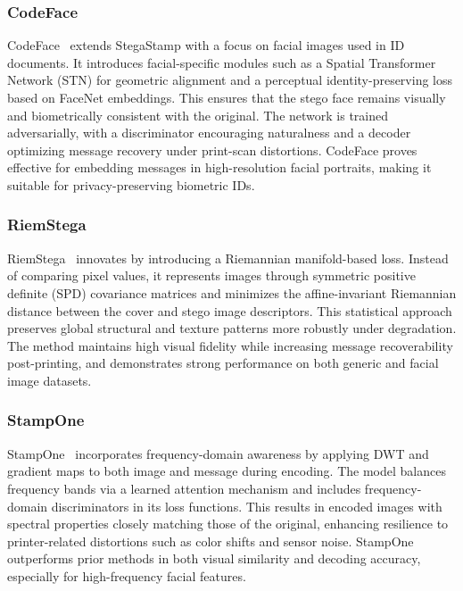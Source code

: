 \subsubsection{CodeFace}
CodeFace~\cite{codeface2021} extends StegaStamp with a focus on facial images used in ID documents. It introduces facial-specific modules such as a Spatial Transformer Network (STN) for geometric alignment and a perceptual identity-preserving loss based on FaceNet embeddings. This ensures that the stego face remains visually and biometrically consistent with the original. The network is trained adversarially, with a discriminator encouraging naturalness and a decoder optimizing message recovery under print-scan distortions. CodeFace proves effective for embedding messages in high-resolution facial portraits, making it suitable for privacy-preserving biometric IDs.

\subsubsection{RiemStega}
RiemStega~\cite{cruz2025riemstega} innovates by introducing a Riemannian manifold-based loss. Instead of comparing pixel values, it represents images through symmetric positive definite (SPD) covariance matrices and minimizes the affine-invariant Riemannian distance between the cover and stego image descriptors. This statistical approach preserves global structural and texture patterns more robustly under degradation. The method maintains high visual fidelity while increasing message recoverability post-printing, and demonstrates strong performance on both generic and facial image datasets.

\subsubsection{StampOne}
StampOne~\cite{stampone2024} incorporates frequency-domain awareness by applying DWT and gradient maps to both image and message during encoding. The model balances frequency bands via a learned attention mechanism and includes frequency-domain discriminators in its loss functions. This results in encoded images with spectral properties closely matching those of the original, enhancing resilience to printer-related distortions such as color shifts and sensor noise. StampOne outperforms prior methods in both visual similarity and decoding accuracy, especially for high-frequency facial features.
